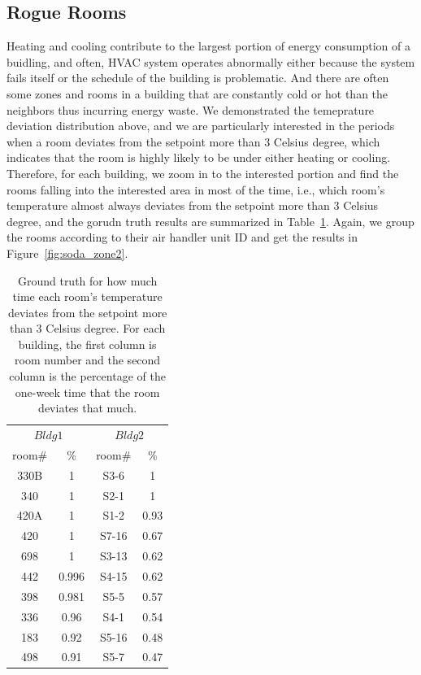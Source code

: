 \subsection{Rogue Rooms}
Heating and cooling contribute to the largest portion of energy consumption of a buidling, and often, HVAC system operates abnormally either because the system fails itself or the schedule of the building is problematic. And there are often some zones and rooms in a building that are constantly cold or hot than the neighbors thus incurring energy waste. We demonstrated the temeprature deviation distribution above, and we are particularly interested in the periods when a room deviates from the setpoint more than 3 Celsius degree, which indicates that the room is highly likely to be under either heating or cooling. Therefore, for each building, we zoom in to the interested portion and find the rooms falling into the interested area in most of the time, i.e., which room's temperature almost always deviates from the setpoint more than 3 Celsius degree, and the gorudn truth results are summarized in Table~\ref{tab:rogue}. Again, we group the rooms according to their air handler unit ID and get the results in Figure~\ref{fig:soda_zone2}.

\begin{table}[ht!]
 \begin{center}
	\begin{tabular}{|c|c|c|c|}
	\multicolumn{2}{c}{$Bldg 1$}
	 & \multicolumn{2}{c}{$Bldg 2$}\\
	\cline{1-4} 
	 room\# & \% & room\# & \%\\
	\cline{1-4}
	 330B & 1 & S3-6 & 1\\
	\cline{1-4}
	 340 & 1 & S2-1 & 1\\
	\cline{1-4}
	420A & 1 & S1-2 & 0.93\\
	\cline{1-4}
	420 & 1 & S7-16 & 0.67\\
	\cline{1-4}
	698 & 1 & S3-13 & 0.62\\
	\cline{1-4}
	442 & 0.996 & S4-15 & 0.62\\
	\cline{1-4}
	398 & 0.981 & S5-5 & 0.57\\
	\cline{1-4}
	336 & 0.96 & S4-1 & 0.54\\
	\cline{1-4}
	183 & 0.92 & S5-16 & 0.48\\
	\cline{1-4}
	498 & 0.91 & S5-7 & 0.47\\
	\cline{1-4}
	\end{tabular}
 \end{center}
 \caption{Ground truth for how much time each room's temperature deviates from the setpoint more than 3 Celsius degree. For each building, the first column is room number and the second column is the percentage of the one-week time that the room deviates that much.}
 \label{tab:rogue}
\end{table}

